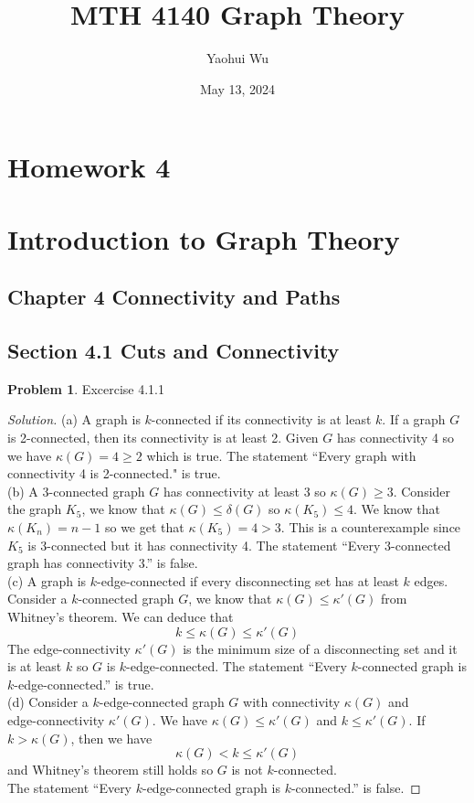 \documentclass[12pt]{article}
\title{MTH 4140 Graph Theory}
\author{Yaohui Wu}
\date{May 13, 2024}
\theoremstyle{definition}
\newtheorem{problem}{Problem}
\newenvironment*{solution}{\begin{proof}[Solution]}{\end{proof}}
\begin{document}
\maketitle
\section*{Homework 4}
\section*{Introduction to Graph Theory}

\subsection*{Chapter 4 Connectivity and Paths}
\subsection*{Section 4.1 Cuts and Connectivity}
\begin{problem}
    Excercise 4.1.1
\end{problem}
\begin{solution}
    (a) A graph is \(k\)-connected if its connectivity is at least \(k\).
    If a graph \(G\) is 2-connected, then its connectivity is at least 2.
    Given \(G\) has connectivity 4 so we have \(\kappa(G)=4\geq2\) which is
    true.
    The statement ``Every graph with connectivity 4 is 2-connected." is
    true. \\
    (b) A 3-connected graph \(G\) has connectivity at least 3 so
    \(\kappa(G)\geq3\).
    Consider the graph \(K_5\), we know that \(\kappa(G)\leq\delta(G)\) so
    \(\kappa(K_5)\leq4\).
    We know that \(\kappa(K_n)=n-1\) so we get that \(\kappa(K_5)=4>3\).
    This is a counterexample since \(K_5\) is 3-connected but it has
    connectivity 4.
    The statement ``Every 3-connected graph has connectivity 3.'' is false. \\
    (c) A graph is \(k\)-edge-connected if every disconnecting set has at
    least \(k\) edges.
    Consider a \(k\)-connected graph \(G\), we know that
    \(\kappa(G)\leq\kappa'(G)\) from Whitney's theorem.
    We can deduce that \[k \leq \kappa(G) \leq \kappa'(G) \]
    The edge-connectivity \(\kappa'(G)\) is the minimum size of a
    disconnecting set and it is at least \(k\) so \(G\) is
    \(k\)-edge-connected.
    The statement ``Every \(k\)-connected graph is \(k\)-edge-connected.'' is
    true. \\
    (d) Consider a \(k\)-edge-connected graph \(G\) with connectivity
    \(\kappa(G)\) and \\ edge-connectivity \(\kappa'(G)\).
    We have \(\kappa(G)\leq\kappa'(G)\) and \(k\leq\kappa'(G)\).
    If \(k>\kappa(G)\), then we have \[\kappa(G)<k\leq\kappa'(G)\] and
    Whitney's theorem still holds so \(G\) is not \(k\)-connected. \\
    The statement ``Every \(k\)-edge-connected graph is \(k\)-connected.'' is
    false.
\end{solution}
\end{document}
